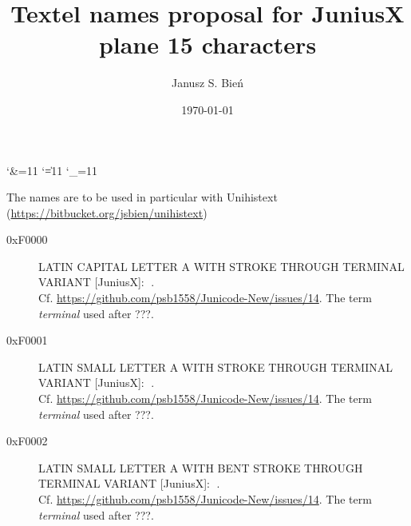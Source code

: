\documentclass{mwart}
\newcommand{\uname}[1]{\texttt{'#1'}}
\newcommand{\ucode}[1]{\texttt{U+#1}}
\newcommand{\aname}[1]{\texttt{#1}}
\newcommand{\acode}[1]{\texttt{#1}}
\newcommand{\mname}[1]{\texttt{'#1 \textsc{<mufi>'}}}
\newcommand{\mcode}[1]{\texttt{M+#1}}
\newcommand{\Jglyph}[1]{{\relsize{2}\J#1}}
\begin{document}




% 
\title{Textel names proposal for JuniusX plane 15 characters}

\author{Janusz S. Bień}

\date{\today}

\maketitle

\catcode`\&=11
\catcode`\|=11
\catcode`\_=11

The names are to be used in particular with Unihistext
(\url{https://bitbucket.org/jsbien/unihistext})

\begin{description}
\item[0xF0000] LATIN CAPITAL LETTER A WITH STROKE THROUGH TERMINAL
  VARIANT [JuniusX]:
  \Jglyph{󰀀}.\\ Cf. \url{https://github.com/psb1558/Junicode-New/issues/14}. The
  term \textit{terminal} used after ???.
\item [0xF0001] LATIN SMALL LETTER A WITH STROKE THROUGH TERMINAL VARIANT [JuniusX]: 
  \Jglyph{󰀁}.\\ Cf. \url{https://github.com/psb1558/Junicode-New/issues/14}. The
  term \textit{terminal} used after ???.
\item [0xF0002] LATIN SMALL LETTER A WITH BENT STROKE THROUGH TERMINAL VARIANT [JuniusX]: 
  \Jglyph{󰀂}.\\ Cf. \url{https://github.com/psb1558/Junicode-New/issues/14}. The
  term \textit{terminal} used after ???.
\end{description}
\end{document}
